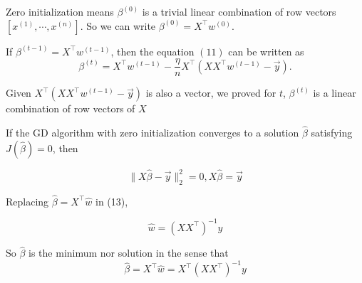 \begin{answer}

Zero initialization means $\beta^{(0)}$ is a trivial linear combination of row vectors $\left[x^{(1)}, \cdots, x^{(n)}\right]$. So we can write $\beta^{(0)} = X^\top w^{(0)}$.


If $\beta^{(t-1)} = X^\top w^{(t-1)}$, then the equation $(11)$ can be written as 
\begin{equation}
	\beta^{(t)}= X^\top w^{(t-1)}-\frac{\eta}{n} X^\top (XX^\top w^{(t-1)}-\vec{y}).
\end{equation}

Given $X^\top (XX^\top w^{(t-1)}-\vec{y})$ is also a vector, we proved for $t$, $\beta^{(t)}$ is a linear combination of row vectors of $X$

If the GD algorithm  with zero initialization converges to a solution $\hat{\beta}$ satisfying $J(\hat{\beta})=0$, then 

\begin{equation}
	\|X\hat{\beta} - \vec y \|_2^2=0 , X\hat{\beta} = \vec y
\end{equation}

Replacing $\hat{\beta} = X^\top \hat w$ in (13), 

\begin{equation}
	\hat w = (X X^\top)^{-1} y
\end{equation}

So $\hat{\beta}$ is the minimum nor solution in the sense that 
\begin{equation}
	\hat{\beta} = X^\top \hat w = X^\top (X X^\top)^{-1} y
\end{equation}

\end{answer}
